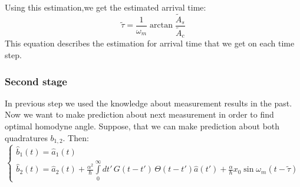 Using this estimation,we get the estimated arrival time:
\begin{equation}
 \tilde{\tau} = \frac{1}{\omega_m}\arctan \frac{\tilde{A}_s}{\tilde{A}_c}
\end{equation}
This equation describes the estimation for arrival time that we get on each time step.

\subsubsection{Second stage}
In previous step we used the knowledge about measurement results in the past. Now we want to make prediction about next measurement in order to find optimal homodyne angle.
Suppose, that we can make prediction about both quadratures $b_{1,2}$. Then:
\begin{equation}
 \begin{cases}\label{b1b2}
  \hat{b}_1(t) = \hat{a}_1(t) \\
  \hat{b}_2(t) = \hat{a}_2(t) + \frac{\alpha^2}{\hbar}\int\limits_0^{\infty} dt' \, G(t-t') \,\Theta(t-t') \hat{a}(t') + \frac{\alpha}{\hbar}x_0 \sin \omega_m (t-\tilde{\tau})
 \end{cases}
\end{equation}

